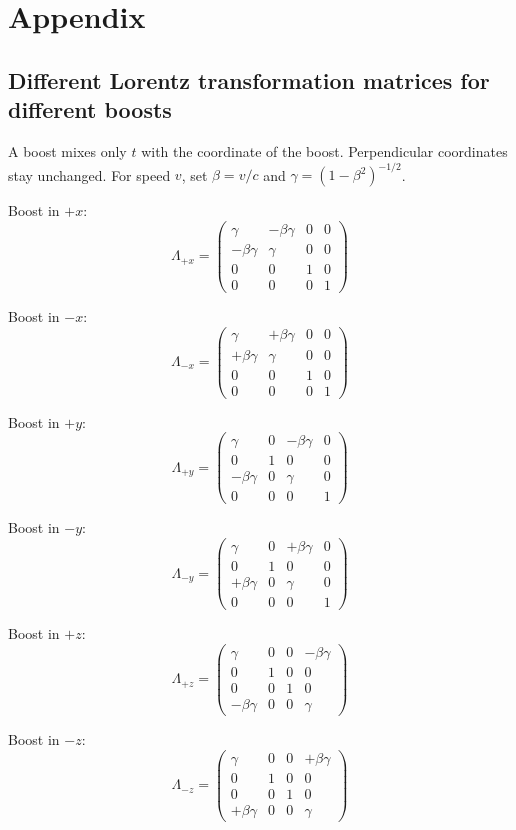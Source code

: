 \documentclass{article}
\begin{document}
\section{Appendix}
\subsection{Different Lorentz transformation matrices for different boosts}
\label{sec:boosts}

A boost mixes only \(t\) with the coordinate of the boost. Perpendicular coordinates stay unchanged. For speed \(v\), set \(\beta=v/c\) and \(\gamma=(1-\beta^{2})^{-1/2}\).

Boost in \(+x\):
\[
\Lambda_{+x}=
\begin{pmatrix}
\gamma & -\beta\gamma & 0 & 0\\
-\beta\gamma & \gamma & 0 & 0\\
0 & 0 & 1 & 0\\
0 & 0 & 0 & 1
\end{pmatrix}
\]

Boost in \(-x\):
\[
\Lambda_{-x}=
\begin{pmatrix}
\gamma & +\beta\gamma & 0 & 0\\
+\beta\gamma & \gamma & 0 & 0\\
0 & 0 & 1 & 0\\
0 & 0 & 0 & 1
\end{pmatrix}
\]

Boost in \(+y\):
\[
\Lambda_{+y}=
\begin{pmatrix}
\gamma & 0 & -\beta\gamma & 0\\
0 & 1 & 0 & 0\\
-\beta\gamma & 0 & \gamma & 0\\
0 & 0 & 0 & 1
\end{pmatrix}
\]

Boost in \(-y\):
\[
\Lambda_{-y}=
\begin{pmatrix}
\gamma & 0 & +\beta\gamma & 0\\
0 & 1 & 0 & 0\\
+\beta\gamma & 0 & \gamma & 0\\
0 & 0 & 0 & 1
\end{pmatrix}
\]

Boost in \(+z\):
\[
\Lambda_{+z}=
\begin{pmatrix}
\gamma & 0 & 0 & -\beta\gamma\\
0 & 1 & 0 & 0\\
0 & 0 & 1 & 0\\
-\beta\gamma & 0 & 0 & \gamma
\end{pmatrix}
\]

Boost in \(-z\):
\[
\Lambda_{-z}=
\begin{pmatrix}
\gamma & 0 & 0 & +\beta\gamma\\
0 & 1 & 0 & 0\\
0 & 0 & 1 & 0\\
+\beta\gamma & 0 & 0 & \gamma
\end{pmatrix}
\]
\end{document}

